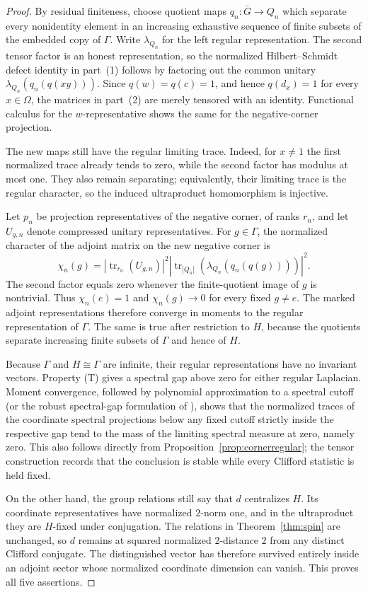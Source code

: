 \documentclass[11pt]{article}
\theoremstyle{definition}
\theoremstyle{remark}
\newcommand{\tr}{\operatorname{tr}}
\begin{document}
\begin{proof}
By residual finiteness, choose quotient maps $q_n:\bar G\to Q_n$ which
separate every nonidentity element in an increasing exhaustive sequence of
finite subsets of the embedded copy of $\Gamma$.  Write $\lambda_{Q_n}$
for the left regular representation.
The second tensor factor is an honest representation, so the normalized
Hilbert--Schmidt defect identity in part~(1) follows by factoring out the
common unitary $\lambda_{Q_n}(q_n(q(xy)))$.  Since $q(w)=q(c)=1$, and hence
$q(d_x)=1$ for every $x\in\Omega$, the matrices in part~(2) are merely
tensored with an identity.  Functional calculus for the $w$-representative
shows the same for the negative-corner projection.

The new maps still have the regular limiting trace.  Indeed, for $x\ne1$
the first normalized trace already tends to zero, while the second factor
has modulus at most one.  They also remain separating; equivalently, their
limiting trace is the regular character, so the induced ultraproduct
homomorphism is injective.

Let $p_n$ be projection representatives of the negative corner, of ranks
$r_n$, and let $U_{g,n}$ denote compressed unitary representatives.  For
$g\in\Gamma$, the normalized character of the adjoint matrix on the new
negative corner is
\[
 \chi_n(g)
 =\left|\tr_{r_n}(U_{g,n})\right|^2
  \left|\tr_{|Q_n|}(\lambda_{Q_n}(q_n(q(g))))\right|^2.
\]
The second factor equals zero whenever the finite-quotient image of $g$ is
nontrivial.  Thus $\chi_n(e)=1$ and $\chi_n(g)\to0$ for every fixed
$g\ne e$.  The marked adjoint representations therefore converge in
moments to the regular representation of $\Gamma$.  The same is true after
restriction to $H$, because the quotients separate increasing finite subsets
of $\Gamma$ and hence of $H$.

Because $\Gamma$ and $H\cong\Gamma$ are infinite, their regular
representations have no invariant vectors.  Property (T) gives a spectral
gap above zero for either regular Laplacian.  Moment convergence, followed
by polynomial approximation to a spectral cutoff (or the robust
spectral-gap formulation of \cite[Section~7]{DogonVigdorovich}), shows that
the normalized traces of the coordinate spectral projections below any
fixed cutoff strictly inside the respective gap tend to the mass of the
limiting spectral measure at zero, namely zero.  This also follows directly
from Proposition~\ref{prop:cornerregular}; the tensor construction records
that the conclusion is stable while every Clifford statistic is held fixed.

On the other hand, the group relations still say that $d$ centralizes $H$.
Its coordinate representatives have normalized $2$-norm one, and in the
ultraproduct they are $H$-fixed under conjugation.  The relations in
Theorem~\ref{thm:spin} are unchanged, so $d$ remains at squared
normalized $2$-distance $2$ from any distinct Clifford conjugate.  The
distinguished vector has therefore survived entirely inside an adjoint
sector whose normalized coordinate dimension can vanish.  This proves all
five assertions.
\end{proof}
\end{document}
